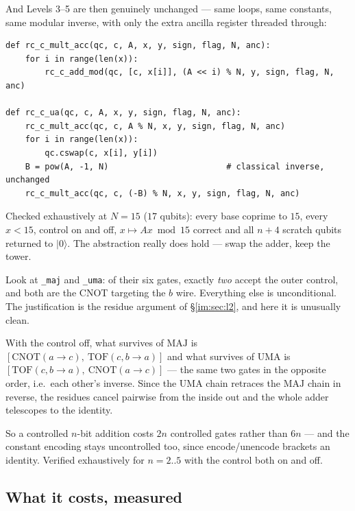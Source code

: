 \documentclass[11pt]{article}
\renewcommand{\ket}[1]{\lvert #1 \rangle}
\newcommand{\CNOT}{\mathrm{CNOT}}
\newcommand{\code}[1]{\texttt{#1}}
\theoremstyle{plain}
\theoremstyle{remark}
\begin{document}
And Levels 3--5 are then genuinely unchanged --- same loops, same constants, same modular inverse,
with only the extra ancilla register threaded through:

\begin{lstlisting}
def rc_c_mult_acc(qc, c, A, x, y, sign, flag, N, anc):
    for i in range(len(x)):
        rc_c_add_mod(qc, [c, x[i]], (A << i) % N, y, sign, flag, N, anc)

def rc_c_ua(qc, c, A, x, y, sign, flag, N, anc):
    rc_c_mult_acc(qc, c, A % N, x, y, sign, flag, N, anc)
    for i in range(len(x)):
        qc.cswap(c, x[i], y[i])
    B = pow(A, -1, N)                        # classical inverse, unchanged
    rc_c_mult_acc(qc, c, (-B) % N, x, y, sign, flag, N, anc)
\end{lstlisting}

\noindent
Checked exhaustively at $N=15$ ($17$ qubits): every base coprime to $15$, every $x<15$, control on
and off, $x\mapsto Ax\bmod15$ correct and all $n{+}4$ scratch qubits returned to $\ket0$. The
abstraction really does hold --- swap the adder, keep the tower.

\begin{keybox}[title={The control trick, again --- and why it telescopes}]
Look at \code{\_maj} and \code{\_uma}: of their six gates, exactly \emph{two} accept the outer
control, and both are the CNOT targeting the $b$ wire. Everything else is unconditional. The
justification is the residue argument of \S\ref{im:sec:l2}, and here it is unusually clean.

With the control off, what survives of $\mathrm{MAJ}$ is $[\CNOT(a\!\to\!c),\
\mathrm{TOF}(c,b\!\to\!a)]$ and what survives of $\mathrm{UMA}$ is
$[\mathrm{TOF}(c,b\!\to\!a),\ \CNOT(a\!\to\!c)]$ --- the same two gates in the opposite order, i.e.\
each other's inverse. Since the $\mathrm{UMA}$ chain retraces the $\mathrm{MAJ}$ chain in reverse,
the residues cancel pairwise from the inside out and the whole adder telescopes to the identity.

So a controlled $n$-bit addition costs $2n$ controlled gates rather than $6n$ --- and the constant
encoding stays uncontrolled too, since encode/unencode brackets an identity. Verified exhaustively
for $n=2..5$ with the control both on and off.
\end{keybox}

\subsection{What it costs, measured}
\end{document}
